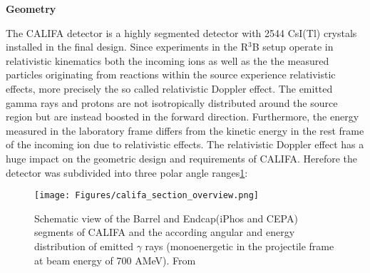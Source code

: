 \textbf{Geometry}\newline

The CALIFA detector is a highly segmented detector with 2544 CsI(Tl) crystals installed in the final design. Since experiments in the R$^3$B setup operate in relativistic kinematics both the incoming ions as well as the the measured particles originating from reactions within the source experience relativistic effects, more precisely the so called relativistic Doppler effect. The emitted gamma rays and protons are not isotropically distributed around the source region but are instead boosted in the forward direction. Furthermore, the energy measured in the laboratory frame differs from the kinetic energy in the rest frame of the incoming ion due to relativistic effects.\newline
The relativistic Doppler effect has a huge impact on the geometric design and requirements of CALIFA. Herefore the detector was subdivided into three polar angle ranges\ref{fig:califa_sec}:
\begin{figure}[htpb]
    \centering
    \texttt{[image: Figures/califa\_section\_overview.png]}
    \caption{
    Schematic view of the Barrel and Endcap(iPhos and CEPA) segments of CALIFA and the according angular and energy distribution of emitted $\gamma$ rays (monoenergetic in the projectile frame at beam energy of 700 AMeV). From \cite{tdr:barrel}
    }
    \label{fig:califa_sec}
\end{figure}

